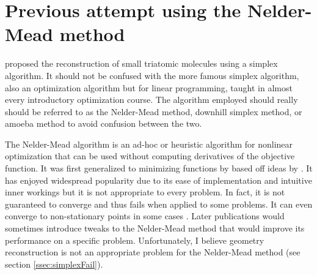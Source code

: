 \section{Previous attempt using the Nelder-Mead method}
\citet{Brichta09} proposed the reconstruction of small triatomic molecules using a simplex algorithm. It should not be confused with the more famous simplex algorithm, also an optimization algorithm but for linear programming, taught in almost every introductory optimization course. The algorithm employed should really should be referred to as the Nelder-Mead method, downhill simplex method, or amoeba method to avoid confusion between the two.\footnotemark


The Nelder-Mead algorithm is an ad-hoc or heuristic algorithm for nonlinear optimization that can be used without computing derivatives of the objective function\footnotemark. It was first generalized to minimizing functions by \citet{Nelder65} based off ideas by \citet{Spendley62}. It has enjoyed widespread popularity due to its ease of implementation and intuitive inner workings but it is not appropriate to every problem. In fact, it is not guaranteed to converge and thus fails when applied to some problems. It can even converge to non-stationary points in some cases \citep{McKinnon98}. Later publications would sometimes introduce tweaks to the Nelder-Mead method that would improve its performance on a specific problem. Unfortunately, I believe geometry reconstruction is not an appropriate problem for the Nelder-Mead method (see section \ref{ssec:simplexFail}).


